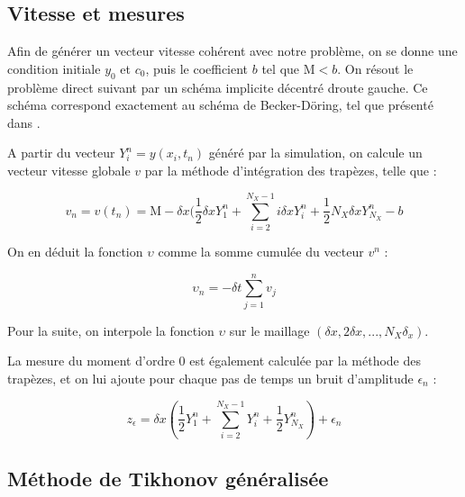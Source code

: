 \documentclass[a4paper]{article}
\newcommand{\mass}{\mathrm{M}}
\begin{document}
\subsection{Vitesse et mesures}

Afin de générer un vecteur vitesse cohérent avec notre problème, on se donne une condition initiale $y_0$ et $c_0$, puis le coefficient $b$ tel que $ \mass<b$.
On résout le problème direct suivant par un schéma
implicite décentré droute gauche. Ce schéma correspond exactement au schéma de Becker-Döring, tel que présenté dans \cite{SHariz}.

A partir du vecteur $Y_i^n=y(x_i,t_n)$ généré par la simulation, on calcule un vecteur vitesse globale $v$ par la méthode d'intégration des trapèzes, telle que :

\[ v_n = v(t_n) = \mass - \delta x (\frac{1}{2} \delta x Y_1^n 
                         + \sum_{i=2}^{N_X-1} i \delta x Y_i^n 
						 +\frac{1}{2} N_X \delta x Y_{N_X}^n
						 -b \]
						 
On en déduit la fonction $\upsilon$ comme la somme cumulée du vecteur $v^n$ :

\[ \upsilon_n = - \delta t \sum_{j=1}^n v_j \]

Pour la suite, on interpole la fonction
$\upsilon$ sur le maillage $(\delta x, 2 \delta x, ..., N_X \delta_x )$.
						 
La mesure du moment d'ordre 0 est également calculée par la méthode des trapèzes, 
et on lui ajoute pour chaque pas de temps un bruit d'amplitude $\epsilon_n$ :

\[ z_{\epsilon} = \delta x (\frac{1}{2} Y_1^n 
                         + \sum_{i=2}^{N_X-1} Y_i^n 
						 +\frac{1}{2} Y_{N_X}^n)
				  + \epsilon_n \]

\subsection{Méthode de Tikhonov généralisée}
\end{document}

